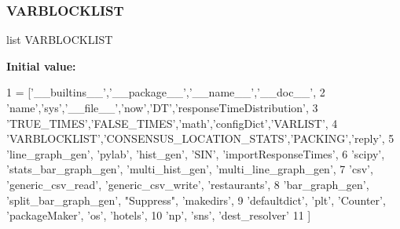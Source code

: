 \subsubsection{\texorpdfstring{V\+A\+R\+B\+L\+O\+C\+K\+L\+I\+ST}{VARBLOCKLIST}}
{\footnotesize\ttfamily list V\+A\+R\+B\+L\+O\+C\+K\+L\+I\+ST}

{\bfseries Initial value\+:}
\begin{DoxyCode}
1 =  [\textcolor{stringliteral}{'\_\_builtins\_\_'},\textcolor{stringliteral}{'\_\_package\_\_'},\textcolor{stringliteral}{'\_\_name\_\_'},\textcolor{stringliteral}{'\_\_doc\_\_'},
2                 \textcolor{stringliteral}{'name'},\textcolor{stringliteral}{'sys'},\textcolor{stringliteral}{'\_\_file\_\_'},\textcolor{stringliteral}{'now'},\textcolor{stringliteral}{'DT'},\textcolor{stringliteral}{'responseTimeDistribution'},
3                 \textcolor{stringliteral}{'TRUE\_TIMES'},\textcolor{stringliteral}{'FALSE\_TIMES'},\textcolor{stringliteral}{'math'},\textcolor{stringliteral}{'configDict'},\textcolor{stringliteral}{'VARLIST'},
4                 \textcolor{stringliteral}{'VARBLOCKLIST'},\textcolor{stringliteral}{'CONSENSUS\_LOCATION\_STATS'},\textcolor{stringliteral}{'PACKING'},\textcolor{stringliteral}{'reply'},
5                 \textcolor{stringliteral}{'line\_graph\_gen'}, \textcolor{stringliteral}{'pylab'}, \textcolor{stringliteral}{'hist\_gen'}, \textcolor{stringliteral}{'SIN'}, \textcolor{stringliteral}{'importResponseTimes'},
6                 \textcolor{stringliteral}{'scipy'}, \textcolor{stringliteral}{'stats\_bar\_graph\_gen'}, \textcolor{stringliteral}{'multi\_hist\_gen'}, \textcolor{stringliteral}{'multi\_line\_graph\_gen'},
7                 \textcolor{stringliteral}{'csv'}, \textcolor{stringliteral}{'generic\_csv\_read'}, \textcolor{stringliteral}{'generic\_csv\_write'}, \textcolor{stringliteral}{'restaurants'},
8                 \textcolor{stringliteral}{'bar\_graph\_gen'}, \textcolor{stringliteral}{'split\_bar\_graph\_gen'}, \textcolor{stringliteral}{"Suppress"}, \textcolor{stringliteral}{'makedirs'},
9                 \textcolor{stringliteral}{'defaultdict'}, \textcolor{stringliteral}{'plt'}, \textcolor{stringliteral}{'Counter'}, \textcolor{stringliteral}{'packageMaker'}, \textcolor{stringliteral}{'os'}, \textcolor{stringliteral}{'hotels'},
10                 \textcolor{stringliteral}{'np'}, \textcolor{stringliteral}{'sns'}, \textcolor{stringliteral}{'dest\_resolver'}
11                 ]
\end{DoxyCode}
\mbox{\label{namespacereorder_abad4087652ccca08b33c499c7aad17b0}} 
